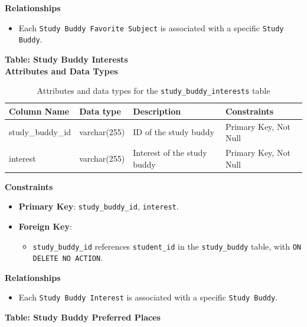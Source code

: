 \documentclass[12pt]{article}
\begin{document}
    \noindent 
    \textbf{Relationships} 
    \begin{itemize} 
        \item Each \texttt{Study Buddy Favorite Subject} is associated with a specific \texttt{Study Buddy}.
    \end{itemize}


    \textbf{Table: Study Buddy Interests} \\

    \textbf{Attributes and Data Types}
    \begin{table}[H] 
        \centering 
        \renewcommand{\arraystretch}{1.5} 
        \begin{tabular}{|l|l|p{4.5cm}|l|} 
        \hline 
        \rowcolor[HTML]{96FFFB} 
        \textbf{Column Name} & \textbf{Data type} & \textbf{Description} & \textbf{Constraints} \\ \hline 
        study\_buddy\_id & varchar(255) & ID of the study buddy & Primary Key, Not Null \\ \hline 
        interest & varchar(255) & Interest of the study buddy & Primary Key, Not Null \\ \hline 
        \end{tabular} 
        \caption{Attributes and data types for the \texttt{study\_buddy\_interests} table} 
    \end{table}

    \noindent 
    \textbf{Constraints} 
    \begin{itemize} 
        \item \textbf{Primary Key}: \texttt{study\_buddy\_id}, \texttt{interest}. 
        \item \textbf{Foreign Key}: \begin{itemize} \item \texttt{study\_buddy\_id} references \texttt{student\_id} in the \texttt{study\_buddy} table, with \texttt{ON DELETE NO ACTION}. 
        \end{itemize} 
    \end{itemize}

    \noindent 
    \textbf{Relationships} 
    \begin{itemize} 
        \item Each \texttt{Study Buddy Interest} is associated with a specific \texttt{Study Buddy}. 
    \end{itemize}

    \textbf{Table: Study Buddy Preferred Places} \\
\end{document}
